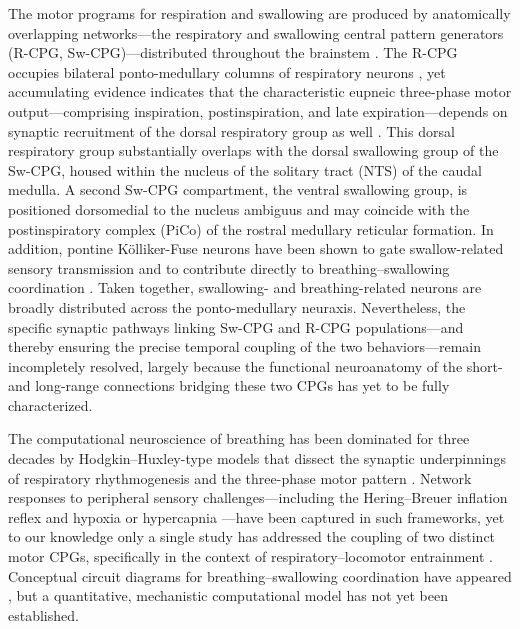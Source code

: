 \documentclass[pdflatex,sn-mathphys-ay]{sn-jnl}%
\theoremstyle{thmstyleone}%
\theoremstyle{thmstyletwo}%
\theoremstyle{thmstylethree}%
\begin{document}
The motor programs for respiration and swallowing are produced by anatomically overlapping networks---the respiratory and swallowing central pattern generators (R-CPG, Sw-CPG)---distributed throughout the brainstem \citep{bianchi2009brainstem}. The R-CPG occupies bilateral ponto-medullary columns of respiratory neurons \citep{alheid2004pontine}, yet accumulating evidence indicates that the characteristic eupneic three-phase motor output---comprising inspiration, postinspiration, and late expiration---depends on synaptic recruitment of the dorsal respiratory group as well \citep{berger1977dorsal, hilaire1990functional, dhingra2019excitation, dhingra2019increasing, dhingra2020volumetric}. This dorsal respiratory group substantially overlaps with the dorsal swallowing group of the Sw-CPG, housed within the nucleus of the solitary tract (NTS) \citep{car1979inputs, kalia1980brain, kessler1985identification, jean2001brain} of the caudal medulla. A second Sw-CPG compartment, the ventral swallowing group, is positioned dorsomedial to the nucleus ambiguus \citep{kessler1985identification, ezure1993location, sugiyama2011axonal, fuse2019effects, huff2023role, toor2019neurons} and may coincide with the postinspiratory complex (PiCo) \citep{toor2019neurons, pitts2021evidence, huff2023role} of the rostral medullary reticular formation. In addition, pontine K\"olliker-Fuse neurons have been shown to gate swallow-related sensory transmission and to contribute directly to breathing--swallowing coordination \citep{bautista2014ponto, takemura2022effect}. Taken together, swallowing- and breathing-related neurons are broadly distributed across the ponto-medullary neuraxis. Nevertheless, the specific synaptic pathways linking Sw-CPG and R-CPG populations---and thereby ensuring the precise temporal coupling of the two behaviors---remain incompletely resolved, largely because the functional neuroanatomy of the short- and long-range connections bridging these two CPGs has yet to be fully characterized.

The computational neuroscience of breathing has been dominated for three decades by Hodgkin--Huxley-type models that dissect the synaptic underpinnings of respiratory rhythmogenesis and the three-phase motor pattern \citep{rybak1997modeling, rybak2004modeling, smith2007spatial, rubin2009multiple, molkov2013control, molkov2014closed, molkov2017computational, lindsey2012computational}. Network responses to peripheral sensory challenges---including the Hering--Breuer inflation reflex \citep{molkov2013control} and hypoxia or hypercapnia \citep{molkov2014closed}---have been captured in such frameworks, yet to our knowledge only a single study has addressed the coupling of two distinct motor CPGs, specifically in the context of respiratory--locomotor entrainment \citep{potts2005respiratory}. Conceptual circuit diagrams for breathing--swallowing coordination have appeared \citep{bolser2013central, pitts2013coordination}, but a quantitative, mechanistic computational model has not yet been established. 
\end{document}
